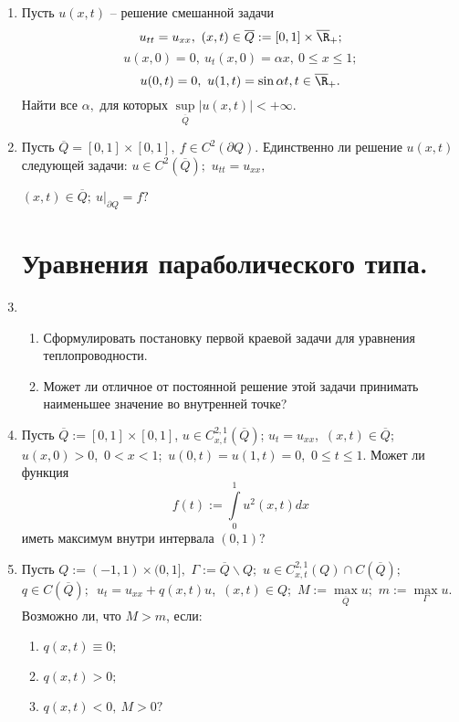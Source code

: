 \documentclass[a4paper]{article}
\def\a{\alpha}
\def\G{\Gamma}
\def\i#1#2{\int\limits_{#1}^{#2}}
\begin{document}
\begin{enumerate}

\item
Пусть $u(x,t)$ -- решение смешанной задачи
$$u_{tt}=u_{xx},\  (x,t)\in \overline{Q}:= [0,1]\times\overline{\R}_+;$$
$$u(x,0)=0,\ u_t(x,0)=\a x,\ 0\le x\le 1;$$
$$u(0,t)=0,\ u(1, t)=\sin\a t, t\in \overline{\R}_+.$$
Найти все $\a,$ для которых $\sup\limits_{\overline Q}
|u(x,t)|<+\infty.$

\item
Пусть $\overline{Q}=[0,1]\times[0,1], \ f\in C^2(\partial Q).$ Единственно ли
решение $u(x,t)$ следующей задачи: $u\in C^2(\overline{Q});$
$u_{tt}=u_{xx},$

\noindent
$(x,t)\in \overline{Q}; \ u\Big|_{\partial Q} = f?$



\section{Уравнения параболического типа.}

\item
\begin{enumerate}
  \item
  Сформулировать постановку первой краевой задачи для уравнения
  теплопроводности.

  \item
  Может ли отличное от постоянной решение этой задачи принимать
  наименьшее значение во внутренней точке?
\end{enumerate}

\item
Пусть $\overline Q:=[0,1]\times[0,1]$, $u\in C^{2,1}_{x,t}(\overline Q)$;
$u_t=u_{xx}$,\  $(x,t)\in \overline Q$;\ $u(x,0)>0$,\ $0<x<1$;\
$u(0,t)=u(1,t)=0$,\ $0\le t\le1.$ Может ли функция
$$f(t):=\i{0}{1} u^2(x, t) dx$$
иметь максимум внутри интервала $(0,1)$?

\item
Пусть $Q:=(-1,1)\times(0,1],$ $\G:=\overline Q\backslash Q;$ $u\in
C^{2,1}_{x,t}(Q)\cap C(\overline Q);$ $q\in C(\overline Q);$\
$u_t=u_{xx} + q(x, t) u$,\  $(x,t)\in Q$;\ $M:=\max\limits_{\overline Q} u;$
$m:=\max\limits_\G u$. Возможно ли, что $M>m$, если:
\begin{enumerate}
  \item
  $q(x,t)\equiv 0;$
  \item
  $q(x,t)> 0;$
  \item
  $q(x,t)< 0,\ M>0?$
\end{enumerate}


\end{enumerate}
\end{document}
